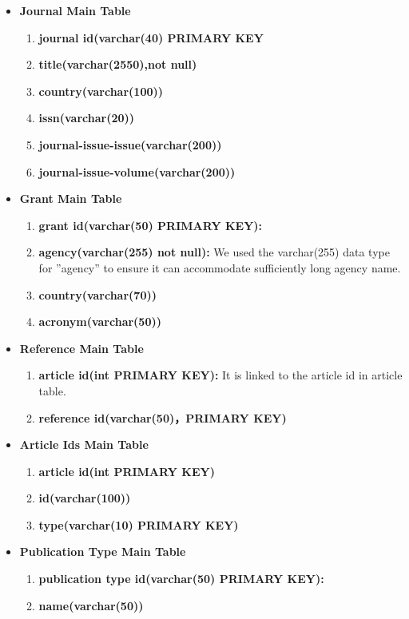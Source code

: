 \documentclass{article}
\begin{document}
\begin{itemize}
\item \textbf{Journal Main Table}
\begin{enumerate}
\item \textbf{journal id(varchar(40) PRIMARY KEY}
\item \textbf{title(varchar(2550),not null)}
\item \textbf{country(varchar(100))}
\item \textbf{issn(varchar(20))}
\item \textbf{journal-issue-issue(varchar(200))}
\item \textbf{journal-issue-volume(varchar(200))}
\end{enumerate}


\item \textbf{Grant Main Table}
\begin{enumerate}
\item \textbf{grant id(varchar(50) PRIMARY KEY):}
\item \textbf{agency(varchar(255) not null):} We used the varchar(255) data type for ”agency” to ensure it can accommodate sufficiently long agency name.
\item \textbf{country(varchar(70))}
\item \textbf{acronym(varchar(50))}
\end{enumerate}


\item \textbf{Reference Main Table}
\begin{enumerate}
\item \textbf{article id(int PRIMARY KEY):} It is linked to the article id in article table.
\item \textbf{reference id(varchar(50)，PRIMARY KEY)}
\end{enumerate}

\item \textbf{Article Ids Main Table}
\begin{enumerate}
\item \textbf{article id(int PRIMARY KEY)}
\item \textbf{id(varchar(100))}
\item \textbf{type(varchar(10) PRIMARY KEY)}
\end{enumerate}

\item \textbf{Publication Type Main Table}
\begin{enumerate}
\item \textbf{publication type id(varchar(50) PRIMARY KEY):}
\item \textbf{name(varchar(50))}
\end{enumerate}
\end{itemize}
\end{document}
